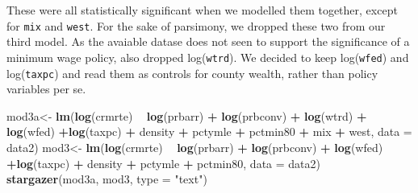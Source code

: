 \documentclass[]{article}
\newenvironment{Shaded}{\begin{snugshade}}{\end{snugshade}}
\newcommand{\DataTypeTok}[1]{\textcolor[rgb]{0.13,0.29,0.53}{#1}}
\newcommand{\KeywordTok}[1]{\textcolor[rgb]{0.13,0.29,0.53}{\textbf{#1}}}
\newcommand{\NormalTok}[1]{#1}
\newcommand{\OperatorTok}[1]{\textcolor[rgb]{0.81,0.36,0.00}{\textbf{#1}}}
\newcommand{\StringTok}[1]{\textcolor[rgb]{0.31,0.60,0.02}{#1}}
\begin{document}
These were all statistically significant when we modelled them together,
except for \texttt{mix} and \texttt{west}. For the sake of parsimony, we
dropped these two from our third model. As the avaiable datase does not
seen to support the significance of a minimum wage policy, also dropped
log(\texttt{wtrd}). We decided to keep log(\texttt{wfed}) and
log(\texttt{taxpc}) and read them as controls for county wealth, rather
than policy variables per se.

\begin{Shaded}
\begin{Highlighting}[]
\NormalTok{mod3a<-}\StringTok{ }\KeywordTok{lm}\NormalTok{(}\KeywordTok{log}\NormalTok{(crmrte) }\OperatorTok{~}\StringTok{ }\KeywordTok{log}\NormalTok{(prbarr) }\OperatorTok{+}\StringTok{ }\KeywordTok{log}\NormalTok{(prbconv) }\OperatorTok{+}\StringTok{ }\KeywordTok{log}\NormalTok{(wtrd) }\OperatorTok{+}\StringTok{ }\KeywordTok{log}\NormalTok{(wfed) }\OperatorTok{+}\KeywordTok{log}\NormalTok{(taxpc) }\OperatorTok{+}\StringTok{ }\NormalTok{density }\OperatorTok{+}\StringTok{ }\NormalTok{pctymle }\OperatorTok{+}\StringTok{ }\NormalTok{pctmin80 }\OperatorTok{+}\StringTok{ }\NormalTok{mix }\OperatorTok{+}\StringTok{ }\NormalTok{west, }\DataTypeTok{data =}\NormalTok{ data2)}
\NormalTok{mod3<-}\StringTok{ }\KeywordTok{lm}\NormalTok{(}\KeywordTok{log}\NormalTok{(crmrte) }\OperatorTok{~}\StringTok{ }\KeywordTok{log}\NormalTok{(prbarr) }\OperatorTok{+}\StringTok{ }\KeywordTok{log}\NormalTok{(prbconv) }\OperatorTok{+}\StringTok{ }\KeywordTok{log}\NormalTok{(wfed) }\OperatorTok{+}\KeywordTok{log}\NormalTok{(taxpc) }\OperatorTok{+}\StringTok{ }\NormalTok{density }\OperatorTok{+}\StringTok{ }\NormalTok{pctymle }\OperatorTok{+}\StringTok{ }\NormalTok{pctmin80, }\DataTypeTok{data =}\NormalTok{ data2)}
\KeywordTok{stargazer}\NormalTok{(mod3a, mod3, }\DataTypeTok{type =} \StringTok{"text"}\NormalTok{)}
\end{Highlighting}
\end{Shaded}
\end{document}
